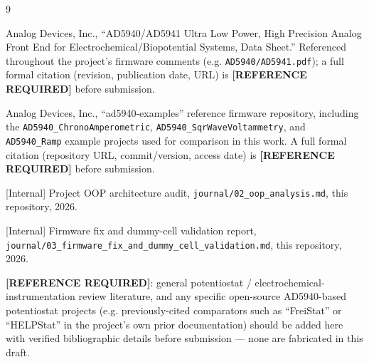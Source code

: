 \documentclass[preprint,12pt]{elsarticle}
\begin{document}
\begin{thebibliography}{9}

Analog Devices, Inc., ``AD5940/AD5941 Ultra Low Power, High Precision Analog Front End for Electrochemical/Biopotential Systems, Data Sheet.'' Referenced throughout the project's firmware comments (e.g. \texttt{AD5940/AD5941.pdf}); a full formal citation (revision, publication date, URL) is \textbf{[REFERENCE REQUIRED]} before submission.

Analog Devices, Inc., ``ad5940-examples'' reference firmware repository, including the \texttt{AD5940\_ChronoAmperometric}, \texttt{AD5940\_SqrWaveVoltammetry}, and \texttt{AD5940\_Ramp} example projects used for comparison in this work. A full formal citation (repository URL, commit/version, access date) is \textbf{[REFERENCE REQUIRED]} before submission.

[Internal] Project OOP architecture audit, \texttt{journal/02\_oop\_analysis.md}, this repository, 2026.

[Internal] Firmware fix and dummy-cell validation report, \texttt{journal/03\_firmware\_fix\_and\_dummy\_cell\_validation.md}, this repository, 2026.

\textbf{[REFERENCE REQUIRED]}: general potentiostat / electrochemical-instrumentation review literature, and any specific open-source AD5940-based potentiostat projects (e.g. previously-cited comparators such as ``FreiStat'' or ``HELPStat'' in the project's own prior documentation) should be added here with verified bibliographic details before submission --- none are fabricated in this draft.

\end{thebibliography}
\end{document}
